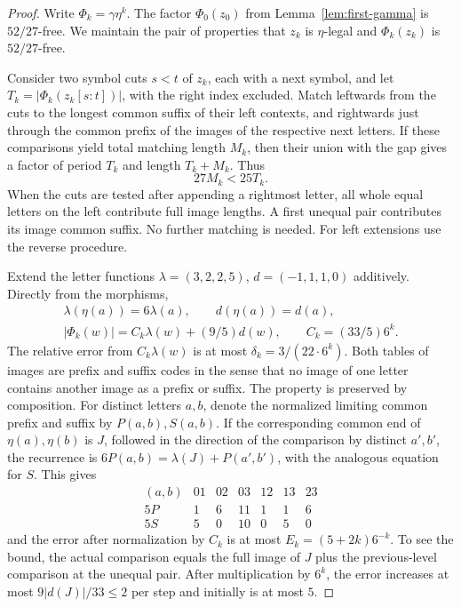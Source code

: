 \begin{proof}
Write \(\Phi_k=\gamma\eta^k\). The factor \(\Phi_0(z_0)\) from Lemma~\ref{lem:first-gamma} is \(52/27\)-free. We maintain the pair of properties that \(z_k\) is \(\eta\)-legal and \(\Phi_k(z_k)\) is \(52/27\)-free.

Consider two symbol cuts \(s<t\) of \(z_k\), each with a next symbol, and let \(T_k=|\Phi_k(z_k[s:t])|\), with the right index excluded. Match leftwards from the cuts to the longest common suffix of their left contexts, and rightwards just through the common prefix of the images of the respective next letters. If these comparisons yield total matching length \(M_k\), then their union with the gap gives a factor of period \(T_k\) and length \(T_k+M_k\). Thus
\begin{equation}\label{eq:cut-ratio}27M_k<25T_k.\end{equation}
When the cuts are tested after appending a rightmost letter, all whole equal letters on the left contribute full image lengths. A first unequal pair contributes its image common suffix. No further matching is needed. For left extensions use the reverse procedure.

Extend the letter functions \(\lambda=(3,2,2,5)\), \(d=(-1,1,1,0)\) additively. Directly from the morphisms,
\[
\begin{gathered}
 \lambda(\eta(a))=6\lambda(a),\qquad d(\eta(a))=d(a),\\
 |\Phi_k(w)|=C_k\lambda(w)+(9/5)d(w),\qquad C_k=(33/5)6^k .
\end{gathered}
\]
The relative error from \(C_k\lambda(w)\) is at most \(\delta_k=3/(22\cdot6^k)\). Both tables of images are prefix and suffix codes in the sense that no image of one letter contains another image as a prefix or suffix. The property is preserved by composition. For distinct letters \(a,b\), denote the normalized limiting common prefix and suffix by \(P(a,b),S(a,b)\). If the corresponding common end of \(\eta(a),\eta(b)\) is \(J\), followed in the direction of the comparison by distinct \(a',b'\), the recurrence is \(6P(a,b)=\lambda(J)+P(a',b')\), with the analogous equation for \(S\). This gives
\[
\begin{array}{c|rrrrrr}
(a,b)&01&02&03&12&13&23\\\hline
 5P&1&6&11&1&1&6\\
 5S&5&0&10&0&5&0
\end{array}
\]
and the error after normalization by \(C_k\) is at most \(E_k=(5+2k)6^{-k}\). To see the bound, the actual comparison equals the full image of \(J\) plus the previous-level comparison at the unequal pair. After multiplication by \(6^k\), the error increases at most \(9|d(J)|/33\le2\) per step and initially is at most \(5\).


\end{proof}
